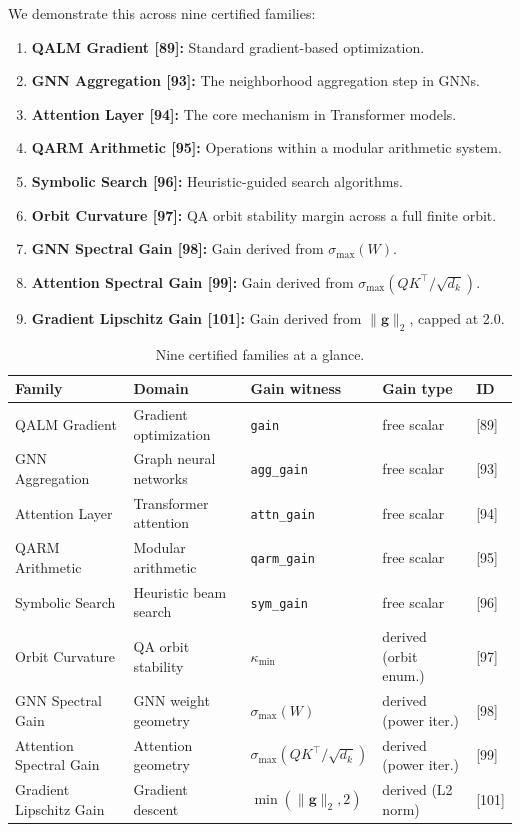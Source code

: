 \documentclass[11pt]{article}
\theoremstyle{definition}
\theoremstyle{remark}
\newcommand{\kmin}{\kappa_{\min}}
\begin{document}
We demonstrate this across nine certified families:
\begin{enumerate}
  \item \textbf{QALM Gradient [89]:} Standard gradient-based optimization.
  \item \textbf{GNN Aggregation [93]:} The neighborhood aggregation step in GNNs.
  \item \textbf{Attention Layer [94]:} The core mechanism in Transformer models.
  \item \textbf{QARM Arithmetic [95]:} Operations within a modular arithmetic system.
  \item \textbf{Symbolic Search [96]:} Heuristic-guided search algorithms.
  \item \textbf{Orbit Curvature [97]:} QA orbit stability margin across a full finite orbit.
  \item \textbf{GNN Spectral Gain [98]:} Gain derived from $\sigma_{\max}(W)$.
  \item \textbf{Attention Spectral Gain [99]:} Gain derived from $\sigma_{\max}(QK^\top/\!\sqrt{d_k})$.
  \item \textbf{Gradient Lipschitz Gain [101]:} Gain derived from $\|\mathbf{g}\|_2$, capped at 2.0.
\end{enumerate}

\begin{table}[h]
\centering
\caption{Nine certified families at a glance.}
\label{tab:families}
\begin{tabular}{lllll}
\toprule
Family & Domain & Gain witness & Gain type & ID \\
\midrule
QALM Gradient & Gradient optimization & \texttt{gain} & free scalar & [89] \\
GNN Aggregation & Graph neural networks & \texttt{agg\_gain} & free scalar & [93] \\
Attention Layer & Transformer attention & \texttt{attn\_gain} & free scalar & [94] \\
QARM Arithmetic & Modular arithmetic & \texttt{qarm\_gain} & free scalar & [95] \\
Symbolic Search & Heuristic beam search & \texttt{sym\_gain} & free scalar & [96] \\
Orbit Curvature & QA orbit stability & $\kmin$ & derived (orbit enum.) & [97] \\
GNN Spectral Gain & GNN weight geometry & $\sigma_{\max}(W)$ & derived (power iter.) & [98] \\
Attention Spectral Gain & Attention geometry & $\sigma_{\max}(QK^\top/\!\sqrt{d_k})$ & derived (power iter.) & [99] \\
Gradient Lipschitz Gain & Gradient descent & $\min(\|\mathbf{g}\|_2,2)$ & derived (L2 norm) & [101] \\
\bottomrule
\end{tabular}
\end{table}
\end{document}

